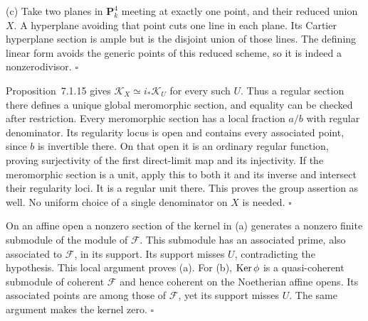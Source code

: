 \documentclass[11pt]{article}
\let\chapterexercise\exercise
\renewcommand{\exercise}[2]{\Needspace{8\baselineskip}\chapterexercise{#1}{#2}}
\begin{document}
(c) Take two planes in $\mathbf P^4_k$ meeting at exactly one point, and their reduced union $X$. A hyperplane avoiding that point cuts one line in each plane. Its Cartier hyperplane section is ample but is the disjoint union of those lines. The defining linear form avoids the generic points of this reduced scheme, so it is indeed a nonzerodivisor. \hfill$\square$

\pf
Proposition~7.1.15 gives $\mathcal K_X\simeq i_*\mathcal K_U$ for every such $U$. Thus a regular section there defines a unique global meromorphic section, and equality can be checked after restriction. Every meromorphic section has a local fraction $a/b$ with regular denominator. Its regularity locus is open and contains every associated point, since $b$ is invertible there. On that open it is an ordinary regular function, proving surjectivity of the first direct-limit map and its injectivity. If the meromorphic section is a unit, apply this to both it and its inverse and intersect their regularity loci. It is a regular unit there. This proves the group assertion as well. No uniform choice of a single denominator on $X$ is needed. \hfill$\square$

\pf
On an affine open a nonzero section of the kernel in (a) generates a nonzero finite submodule of the module of $\mathcal F$. This submodule has an associated prime, also associated to $\mathcal F$, in its support. Its support misses $U$, contradicting the hypothesis. This local argument proves (a). For (b), $\operatorname{Ker}\phi$ is a quasi-coherent submodule of coherent $\mathcal F$ and hence coherent on the Noetherian affine opens. Its associated points are among those of $\mathcal F$, yet its support misses $U$. The same argument makes the kernel zero. \hfill$\square$
\end{document}
